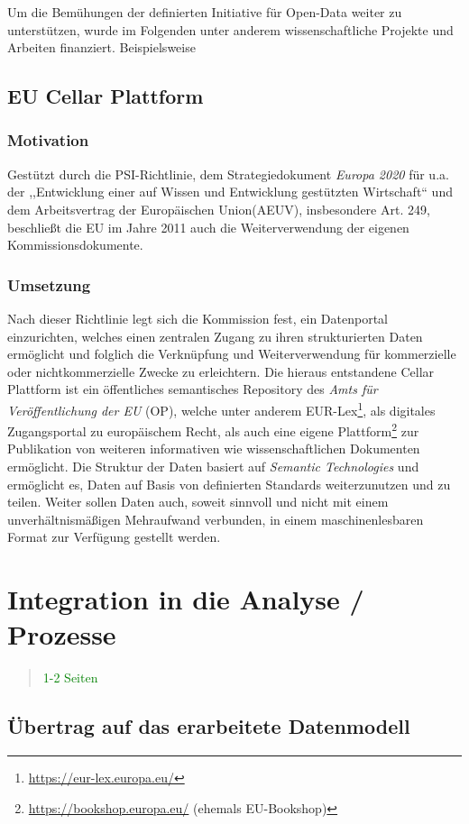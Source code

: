 Um die Bemühungen der definierten Initiative für Open-Data weiter zu unterstützen, wurde im Folgenden unter anderem wissenschaftliche Projekte und Arbeiten finanziert.
Beispielsweise 



        
        \pagebreak
        \subsection{EU Cellar Plattform}

        \subsubsection{Motivation}
        
Gestützt durch die PSI-Richtlinie, dem Strategiedokument \textit{Europa 2020} für u.a. der ,,Entwicklung einer auf Wissen und Entwicklung gestützten Wirtschaft`` und dem Arbeitsvertrag der Europäischen Union(AEUV), insbesondere Art. 249, beschließt die EU im Jahre 2011 auch die Weiterverwendung der eigenen Kommissionsdokumente. \cite[ErwG. 1]{2011D0833}

        \subsubsection{Umsetzung}

Nach dieser Richtlinie legt sich die Kommission fest, ein Datenportal einzurichten, welches einen zentralen Zugang zu ihren strukturierten Daten ermöglicht und folglich die Verknüpfung und Weiterverwendung für kommerzielle oder nichtkommerzielle Zwecke zu erleichtern. \cite[Art. 5]{2011D0833}
Die hieraus entstandene Cellar Plattform ist ein öffentliches semantisches Repository des \textit{Amts für Veröffentlichung der EU} (OP), welche unter anderem EUR-Lex\footnote{\href{https://eur-lex.europa.eu/homepage.html?locale=de}{https://eur-lex.europa.eu/}}, als digitales Zugangsportal zu europäischem Recht, als auch eine eigene Plattform\footnote{\href{https://bookshop.europa.eu/}{https://bookshop.europa.eu/} (ehemals EU-Bookshop)} zur Publikation von weiteren informativen wie wissenschaftlichen Dokumenten ermöglicht.
Die Struktur der Daten basiert auf \textit{Semantic Technologies} und ermöglicht es, Daten auf Basis von definierten Standards weiterzunutzen und zu teilen. \cite[5]{eu_cellar}
Weiter sollen Daten auch, soweit sinnvoll und nicht mit einem unverhältnismäßigen Mehraufwand verbunden, in einem maschinenlesbaren Format zur Verfügung gestellt werden. \cite[Art. 8 Abs. 1f]{2011D0833}


    

        \pagebreak
    
    \section{Integration in die Analyse / Prozesse}
    
\begin{quote}
\textcolor{green}{1-2 Seiten}
\end{quote}

\subsection{Übertrag auf das erarbeitete Datenmodell}
\pagebreak